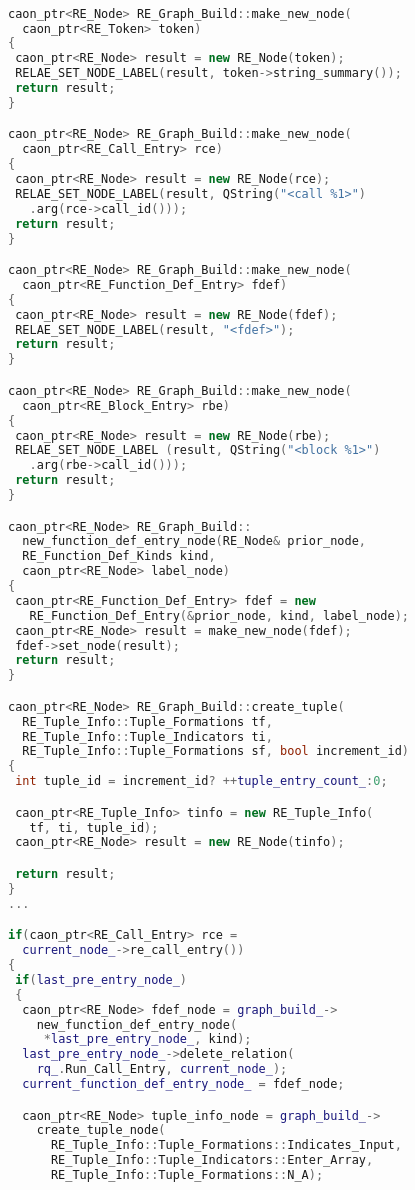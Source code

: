 \begin{lstlisting}[caption={Initializing Hypernodes}, 
  language = C++, numbers = none, escapechar = !, 
  label={lst:initializing-hypernodes},
    basicstyle = \ttfamily\bfseries\footnotesize, 
	linewidth = 1.01\linewidth]

caon_ptr<RE_Node> RE_Graph_Build::make_new_node(
  caon_ptr<RE_Token> token)
{
 caon_ptr<RE_Node> result = new RE_Node(token);
 RELAE_SET_NODE_LABEL(result, token->string_summary());
 return result;
}

caon_ptr<RE_Node> RE_Graph_Build::make_new_node(
  caon_ptr<RE_Call_Entry> rce)
{
 caon_ptr<RE_Node> result = new RE_Node(rce);
 RELAE_SET_NODE_LABEL(result, QString("<call %1>")
   .arg(rce->call_id()));
 return result;
}

caon_ptr<RE_Node> RE_Graph_Build::make_new_node(
  caon_ptr<RE_Function_Def_Entry> fdef)
{
 caon_ptr<RE_Node> result = new RE_Node(fdef);
 RELAE_SET_NODE_LABEL(result, "<fdef>");
 return result;
}

caon_ptr<RE_Node> RE_Graph_Build::make_new_node(
  caon_ptr<RE_Block_Entry> rbe)
{
 caon_ptr<RE_Node> result = new RE_Node(rbe);
 RELAE_SET_NODE_LABEL (result, QString("<block %1>")
   .arg(rbe->call_id()));
 return result;
}

caon_ptr<RE_Node> RE_Graph_Build::
  new_function_def_entry_node(RE_Node& prior_node,
  RE_Function_Def_Kinds kind, 
  caon_ptr<RE_Node> label_node)
{
 caon_ptr<RE_Function_Def_Entry> fdef = new 
   RE_Function_Def_Entry(&prior_node, kind, label_node);
 caon_ptr<RE_Node> result = make_new_node(fdef);
 fdef->set_node(result);
 return result;
}

caon_ptr<RE_Node> RE_Graph_Build::create_tuple(
  RE_Tuple_Info::Tuple_Formations tf,
  RE_Tuple_Info::Tuple_Indicators ti, 
  RE_Tuple_Info::Tuple_Formations sf, bool increment_id)
{
 int tuple_id = increment_id? ++tuple_entry_count_:0;

 caon_ptr<RE_Tuple_Info> tinfo = new RE_Tuple_Info(
   tf, ti, tuple_id);
 caon_ptr<RE_Node> result = new RE_Node(tinfo);

 return result;
}
...

if(caon_ptr<RE_Call_Entry> rce = 
  current_node_->re_call_entry())
{
 if(last_pre_entry_node_)
 {
  caon_ptr<RE_Node> fdef_node = graph_build_->
    new_function_def_entry_node(
     *last_pre_entry_node_, kind);
  last_pre_entry_node_->delete_relation(
    rq_.Run_Call_Entry, current_node_);
  current_function_def_entry_node_ = fdef_node;

  caon_ptr<RE_Node> tuple_info_node = graph_build_->
    create_tuple_node(
      RE_Tuple_Info::Tuple_Formations::Indicates_Input,
      RE_Tuple_Info::Tuple_Indicators::Enter_Array, 
      RE_Tuple_Info::Tuple_Formations::N_A);
	

\end{lstlisting}
